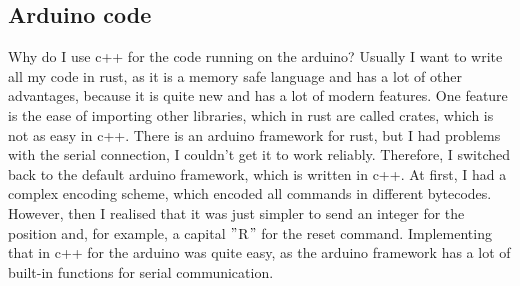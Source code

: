 \subsection{Arduino code}\label{subsec:arduino-code}
Why do I use c++\autocite{arduino-c++} for the code running on the arduino?
Usually I want to write all my code in rust, as it is a memory safe language and has a lot of other advantages, because it is quite new and has a lot of modern features.
One feature is the ease of importing other libraries, which in rust are called crates, which is not as easy in c++.
There is an arduino framework for rust, but I had problems with the serial connection, I couldn't get it to work reliably.
Therefore, I switched back to the default arduino framework, which is written in c++.
At first, I had a complex encoding scheme, which encoded all commands in different bytecodes.
However, then I realised that it was just simpler to send an integer for the position and, for example, a capital \("\)R\("\) for the reset command.
Implementing that in c++ for the arduino was quite easy, as the arduino framework has a lot of built-in functions for serial communication.